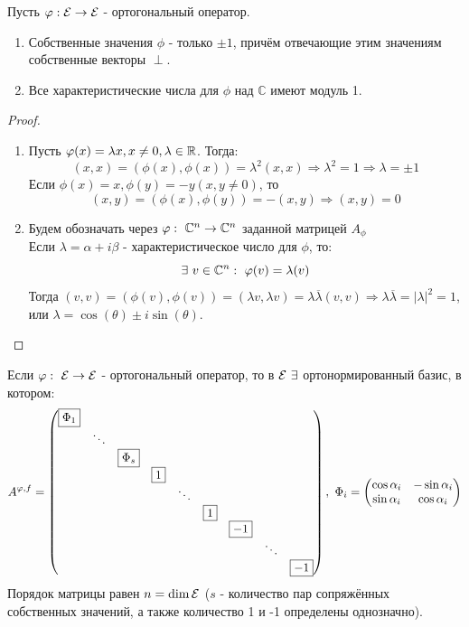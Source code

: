 \begin{theorem}
    Пусть $\varphi: \mathcal{E} \rightarrow \mathcal{E}$ - ортогональный оператор.
    \begin{enumerate}
        \item Собственные значения $\phi$ - только $\pm 1$, причём отвечающие этим значениям собственные векторы $\perp$.
        \item Все характеристические числа для $\phi$ над $\mathbb{C}$ имеют модуль 1. 
    \end{enumerate}
\end{theorem}
\begin{proof}\tab
    \begin{enumerate}
        \item Пусть $\varphi(x) = \lambda x, x \neq 0, \lambda \in \mathbb{R}$. Тогда:
        $$(x, x) = (\phi(x), \phi(x)) = \lambda^2(x,x) \Longrightarrow \lambda^2 = 1 \Longrightarrow \lambda = \pm 1$$ 
        Если $\phi(x) = x, \phi(y) = -y (x,y \neq 0)$, то
        $$(x, y) = (\phi(x), \phi(y)) = -(x, y) \Longrightarrow (x, y) = 0$$
        \item Будем обозначать через $\varphi: \ \mathbb{C}^n \to \mathbb{C}^n$ заданной матрицей $A_\phi$ \\
        Если $\lambda = \alpha + i\beta$ - характеристическое число для $\phi$, то: 
        $$\exists \ v \in \mathbb{C}^n: \ \varphi(v) = \lambda(v)$$
        Тогда $(v, v) = (\phi(v), \phi(v)) = (\lambda v, \lambda v) = \lambda \overline{\lambda}(v,v) \Longrightarrow \lambda \overline{\lambda} = |\lambda|^2 = 1$, или $\lambda = \cos(\theta) \pm i \sin(\theta)$.
    \end{enumerate}
\end{proof}
\begin{theorem}
    Если $\varphi: \ \mathcal{E} \to \mathcal{E}$ - ортогональный оператор, то в $\E \ \exists$ ортонормированный базис, в котором:
    $$A^{\phi,f} = \begin{pmatrix}
        \text{\fbox{$\Phi_1$}}\\
        \null & \ddots\\
        \null & \null & \text{\fbox{$\Phi_s$}}\\
        \null & \null & \null & \text{\fbox{$1$}} \\
        \null & \null & \null & \null & \ddots \\
        \null & \null & \null & \null & \null & \text{\fbox{$1$}}\\
        \null & \null & \null & \null & \null & \null & \text{\fbox{$-1$}} \\
        \null & \null & \null & \null & \null & \null & \null & \ddots \\
        \null & \null & \null & \null & \null & \null & \null & \null & \text{\fbox{$-1$}}
    \end{pmatrix}, \ \Phi_i = \begin{pmatrix}
        \cos \alpha_i & -\sin \alpha_i \\ \sin \alpha_i & \cos \alpha_i
    \end{pmatrix}$$   
    Порядок матрицы равен $ n = \dim \mathcal{E}$ ($s$ - количество пар сопряжённых собственных значений, а также количество 1 и -1 определены однозначно). 
\end{theorem} 
